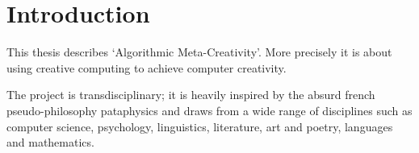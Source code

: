 
\chapter{Introduction}
\label{ch:intro}

\startcontents[chapters]
\minicontents


\brule %


%

\brule %

This thesis describes `Algorithmic Meta-Creativity'. More precisely it is about using creative computing to achieve computer creativity.

The project is transdisciplinary; it is heavily inspired by the absurd french pseudo-philosophy pataphysics and draws from a wide range of disciplines such as computer science, psychology, linguistics, literature, art and poetry, languages and mathematics.

